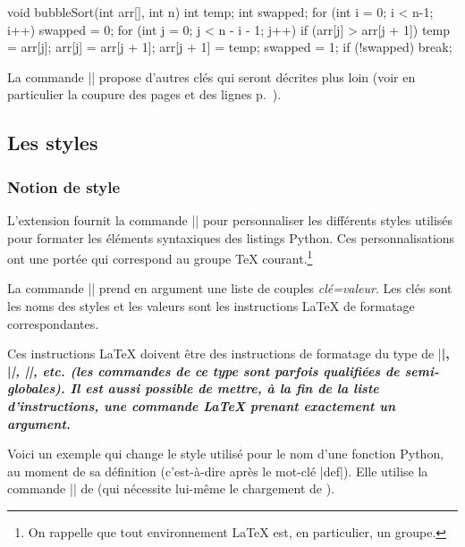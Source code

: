 \documentclass[dvipsnames,svgnames]{article}
\begin{document}
\begin{Piton}[language=C,line-numbers,auto-gobble,background-color = gray!15]
    void bubbleSort(int arr[], int n) {
        int temp;
        int swapped;
        for (int i = 0; i < n-1; i++) {
            swapped = 0;
            for (int j = 0; j < n - i - 1; j++) {
                if (arr[j] > arr[j + 1]) {
                    temp = arr[j];
                    arr[j] = arr[j + 1];
                    arr[j + 1] = temp;
                    swapped = 1; 
                }
            }
            if (!swapped) break;
        }
    }   
\end{Piton}




\bigskip
La commande |\PitonOptions| propose d'autres clés qui seront décrites plus loin (voir en particulier la coupure des
pages et des lignes p.~\pageref{breakable}).


\subsection{Les styles}

\label{styles}

\subsubsection{Notion de style}

L'extension  fournit la commande |\SetPitonStyle| pour personnaliser les différents styles utilisés pour
formater les éléments syntaxiques des listings Python. Ces personnalisations ont une portée qui correspond au
groupe TeX courant.\footnote{On rappelle que tout environnement LaTeX est, en particulier, un groupe.}

\bigskip
{}
La commande |\SetPitonStyle| prend en argument une liste de couples \textsl{clé=valeur}. Les clés sont les noms des
styles et les valeurs sont les instructions LaTeX de formatage correspondantes.

\bigskip
Ces instructions LaTeX doivent être des instructions de formatage du type de |\bfseries|, |\slshape|,
|\color{...}|, etc. (les commandes de ce type sont parfois qualifiées de \emph{semi-globales}). Il est aussi
possible de mettre, \emph{à la fin de la liste d'instructions}, une commande LaTeX prenant exactement un argument.

\bigskip
Voici un exemple qui change le style utilisé pour le nom d'une fonction Python, au moment de sa définition
(c'est-à-dire après le mot-clé |def|). Elle utilise la commande |\highLight| de  (qui nécessite
lui-même le chargement de ).
\end{document}
